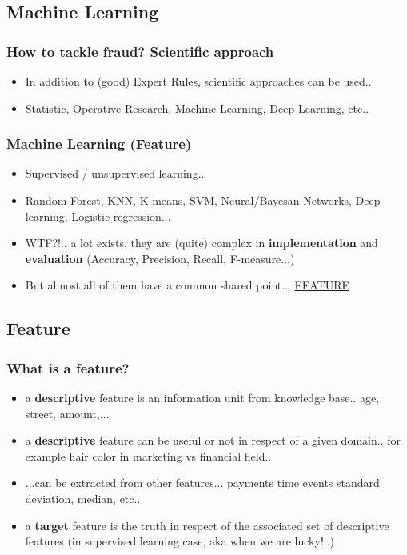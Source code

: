 \documentclass{beamer}
\begin{document}
\subsection{Machine Learning}
\begin{frame}
  \frametitle{How to tackle fraud? Scientific approach}
  \begin{itemize}
	\item<+-> In addition to (good) Expert Rules, scientific approaches can be used.. 
	\item<+-> Statistic, Operative Research, Machine Learning, Deep Learning, etc.. 
   \end{itemize}
\end{frame}

\begin{frame}
  \frametitle{Machine Learning (Feature)}
  \begin{itemize}
	\item<+-> Supervised / unsupervised learning.. 
	\item<+-> Random Forest, KNN, K-means, SVM, Neural/Bayesan Networks, Deep learning, Logistic regression...
	\item<+-> WTF?!.. a lot exists, they are (quite) complex in \textbf{implementation} and \textbf{evaluation} (Accuracy, Precision, Recall, F-measure...)
	\item<+-> But almost all of them have a common shared point... \underline{FEATURE}
   \end{itemize}
\end{frame}

\subsection{Feature}
\begin{frame}
  \frametitle{What is a feature?}
  \begin{itemize}
	\item<+-> a \textbf{descriptive} feature is an information unit from knowledge base.. age, street, amount,...
	\item<+-> a \textbf{descriptive} feature can be useful or not in respect of a given domain.. for example hair color in marketing vs financial field..
	\item<+-> ...can be extracted from other features... payments time events standard deviation, median, etc.. 
	\item<+-> a \textbf{target} feature is the truth in respect of the associated set of descriptive features (in supervised learning case, aka when we are lucky!..)
   \end{itemize}
\end{frame}
\end{document}
